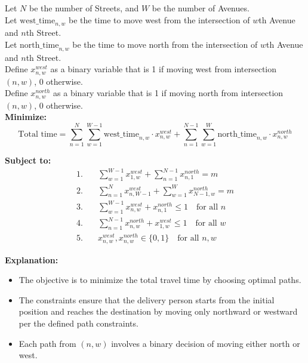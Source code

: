 \documentclass{article}
\begin{document}
Let \( N \) be the number of Streets, and \( W \) be the number of Avenues. \\
Let \( \text{west\_time}_{n,w} \) be the time to move west from the intersection of \( w \)th Avenue and \( n \)th Street. \\
Let \( \text{north\_time}_{n,w} \) be the time to move north from the intersection of \( w \)th Avenue and \( n \)th Street. \\

Define \( x_{n,w}^{west} \) as a binary variable that is 1 if moving west from intersection \((n, w)\), 0 otherwise. \\
Define \( x_{n,w}^{north} \) as a binary variable that is 1 if moving north from intersection \((n, w)\), 0 otherwise. \\

\textbf{Minimize:} 
\[
\text{Total time} = \sum_{n=1}^{N} \sum_{w=1}^{W-1} \text{west\_time}_{n,w} \cdot x_{n,w}^{west} + \sum_{n=1}^{N-1} \sum_{w=1}^{W} \text{north\_time}_{n,w} \cdot x_{n,w}^{north}
\]

\textbf{Subject to:}
\begin{align*}
1. & \quad \sum_{w=1}^{W-1} x_{1,w}^{west} + \sum_{n=1}^{N-1} x_{n,1}^{north} = m \\
2. & \quad \sum_{n=1}^{N} x_{n,W-1}^{west} + \sum_{w=1}^{W} x_{N-1,w}^{north} = m \\
3. & \quad \sum_{w=1}^{W-1} x_{n,w}^{west} + x_{n,1}^{north} \leq 1 \quad \text{for all } n \\
4. & \quad \sum_{n=1}^{N-1} x_{n,w}^{north} + x_{1,w}^{west} \leq 1 \quad \text{for all } w \\
5. & \quad x_{n,w}^{west}, x_{n,w}^{north} \in \{0, 1\} \quad \text{for all } n,w
\end{align*}

\textbf{Explanation:}
\begin{itemize}
    \item The objective is to minimize the total travel time by choosing optimal paths.
    \item The constraints ensure that the delivery person starts from the initial position and reaches the destination by moving only northward or westward per the defined path constraints.
    \item Each path from \( (n, w) \) involves a binary decision of moving either north or west.
\end{itemize}
\end{document}

